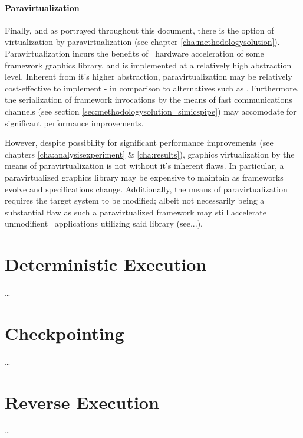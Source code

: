 \paragraph{Paravirtualization}
\label{par:analysissolution_paravirtualization}
Finally, and as portrayed throughout this document, there is the option of virtualization by paravirtualization (see chapter \ref{cha:methodologysolution}).
Paravirtualization incurs the benefits of \dvttermhost\ hardware acceleration of some framework graphics library, and is implemented at a relatively high abstraction level.
Inherent from it's higher abstraction, paravirtualization may be relatively cost-effective to implement - in comparison to alternatives such as .
Furthermore, the serialization of framework invocations by the means of fast communications channels (see section \ref{sec:methodologysolution_simicspipe}) may accomodate for significant performance improvements.

However, despite possibility for significant performance improvements (see chapters \ref{cha:analysisexperiment} \& \ref{cha:results}), graphics virtualization by the means of paravirtualization is not without it's inherent flaws.
In particular, a paravirtualized graphics library may be expensive to maintain as frameworks evolve and specifications change.
Additionally, the means of paravirtualization requires the target system to be modified; albeit not necessarily being a substantial flaw as such a paravirtualized framework may still accelerate unmodifient \dvttermtarget\ applications utilizing said library (see...).



\section{Deterministic Execution}
\label{sec:analysissolution_deterministicexecution}
\ldots

\section{Checkpointing}
\label{sec:analysissolution_checkpointing}
\ldots

\section{Reverse Execution}
\label{sec:analysissolution_reverseexecution}
\ldots
